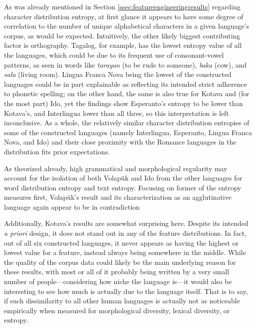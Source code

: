 \documentclass[12pt,a4paper]{article}
\numberwithin{figure}{section}
\numberwithin{table}{section}
\numberwithin{definition}{section}
\begin{document}
As was already mentioned in Section \ref{ssec:featureengineeringresults} regarding character distribution entropy, at first glance it appears to have some degree of correlation to the number of unique alphabetical characters in a given language's corpus, as would be expected. Intuitively, the other likely biggest contributing factor is orthography. Tagalog, for example, has the lowest entropy value of all the languages, which could be due to its frequent use of consonant-vowel patterns, as seen in words like \textit{tarayan} (to be rude to someone), \textit{baka} (cow), and \textit{sala} (living room). Lingua Franca Nova being the lowest of the constructed languages could be in part explainable as reflecting its intended strict adherence to phonetic spelling; on the other hand, the same is also true for Kotava and (for the most part) Ido, yet the findings show Esperanto's entropy to be lower than Kotava's, and Interlingua lower than all three, so this interpretation is left inconclusive. As a whole, the relatively similar character distribution entropies of some of the constructed languages (namely Interlingua, Esperanto, Lingua Franca Nova, and Ido) and their close proximity with the Romance languages in the distribution fits prior expectations. 

As theorized already, high grammatical and morphological regularity may account for the isolation of both Volapük and Ido from the other languages for word distribution entropy and text entropy. Focusing on former of the entropy measures first, Volapük's result and its characterization as an agglutinative language again appear to be in contradiction 



Additionally, Kotava's results are somewhat surprising here. Despite its intended \textit{a priori} design, it does not stand out in any of the feature distributions. In fact, out of all six constructed languages, it never appears as having the highest or lowest value for a feature, instead always being somewhere in the middle. While the quality of the corpus data could likely be the main underlying reason for these results, with most or all of it probably being written by a very small number of people---considering how niche the language is---it would also be interesting to see how much is actually due to the language itself. That is to say, if such dissimilarity to all other human languages is actually not as noticeable empirically when measured for morphological diversity, lexical diversity, or entropy.
\end{document}
